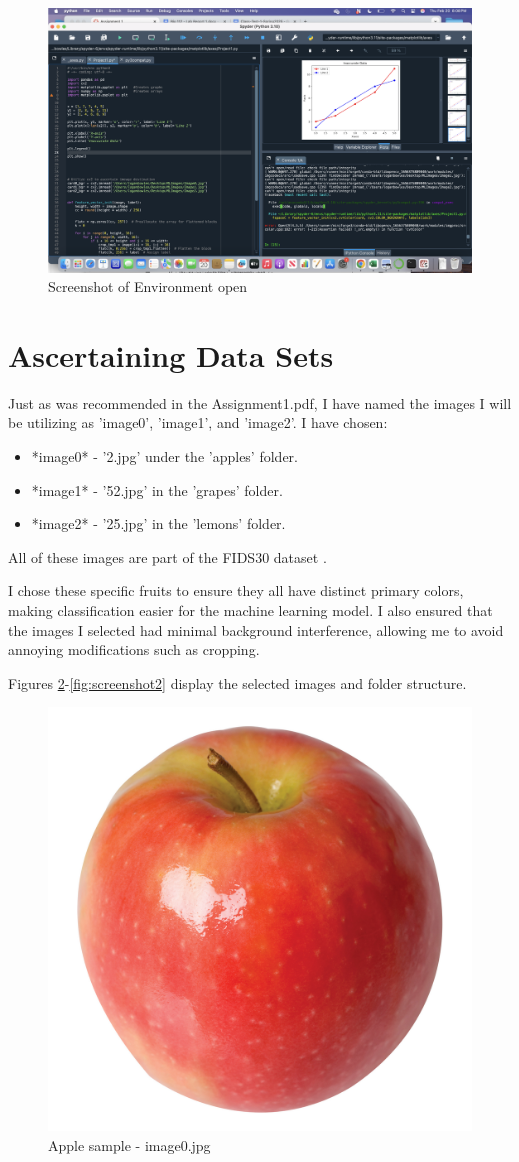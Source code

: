 \documentclass[conference]{IEEEtran} %
\begin{document}
\begin{figure}[H]
    \centering
    \includegraphics[width=0.5\linewidth]{task1_2.png}
    \caption{Screenshot of Environment open}
    \label{fig:task1_2}
\end{figure}


\section{Ascertaining Data Sets}

Just as was recommended in the Assignment1.pdf, I have named the images I will be utilizing as 'image0', 'image1', and 'image2'. I have chosen:
\begin{itemize}
    \item *image0* - '2.jpg' under the 'apples' folder.
    \item *image1* - '52.jpg' in the 'grapes' folder.
    \item *image2* - '25.jpg' in the 'lemons' folder.
\end{itemize}

All of these images are part of the FIDS30 dataset \cite{Skrjanec2013}. 

I chose these specific fruits to ensure they all have distinct primary colors, making classification easier for the machine learning model. I also ensured that the images I selected had minimal background interference, allowing me to avoid annoying modifications such as  cropping.

Figures \ref{fig:image0}-\ref{fig:screenshot2} display the selected images and folder structure.

\begin{figure}[H]
    \centering
    \includegraphics[width=0.5\linewidth]{image0.jpg}
    \caption{Apple sample - image0.jpg}
    \label{fig:image0}
\end{figure}
\end{document}
